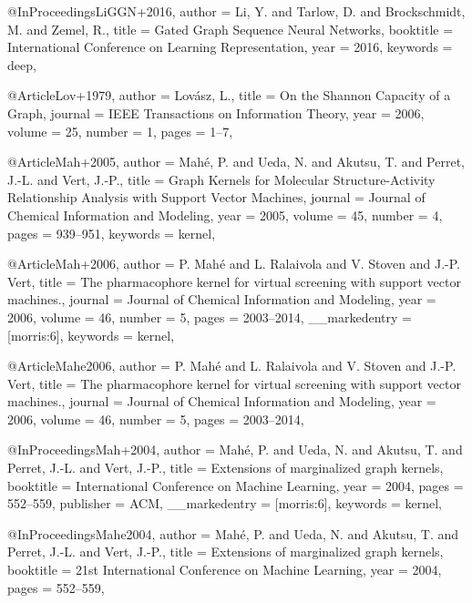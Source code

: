 @InProceedings{LiGGN+2016,
  author    = {Li, Y. and Tarlow, D. and Brockschmidt, M. and Zemel, R.},
  title     = {Gated Graph Sequence Neural Networks},
  booktitle = {International Conference on Learning Representation},
  year      = {2016},
  keywords  = {deep},
}

@Article{Lov+1979,
  author  = {Lovász, L.},
  title   = {On the Shannon Capacity of a Graph},
  journal = {IEEE Transactions on Information Theory},
  year    = {2006},
  volume  = {25},
  number  = {1},
  pages   = {1--7},
}

@Article{Mah+2005,
  author   = {Mah{\'{e}}, P. and Ueda, N. and Akutsu, T. and Perret, J.-L. and Vert, J.-P.},
  title    = {Graph Kernels for Molecular Structure-Activity Relationship Analysis with Support Vector Machines},
  journal  = {Journal of Chemical Information and Modeling},
  year     = {2005},
  volume   = {45},
  number   = {4},
  pages    = {939--951},
  keywords = {kernel},
}

@Article{Mah+2006,
  author        = {P. Mah\'{e} and L. Ralaivola and V. Stoven and J.-P. Vert},
  title         = {The pharmacophore kernel for virtual screening with support vector machines.},
  journal       = {Journal of Chemical Information and Modeling},
  year          = {2006},
  volume        = {46},
  number        = {5},
  pages         = {2003--2014},
  __markedentry = {[morris:6]},
  keywords      = {kernel},
}

@Article{Mahe2006,
  author  = {P. Mah\'{e} and L. Ralaivola and V. Stoven and J.-P. Vert},
  title   = {The pharmacophore kernel for virtual screening with support vector machines.},
  journal = {Journal of Chemical Information and Modeling},
  year    = {2006},
  volume  = {46},
  number  = {5},
  pages   = {2003--2014},
}

@InProceedings{Mah+2004,
  author        = {Mah\'{e}, P. and Ueda, N. and Akutsu, T. and Perret, J.-L. and Vert, J.-P.},
  title         = {Extensions of marginalized graph kernels},
  booktitle     = {International Conference on Machine Learning},
  year          = {2004},
  pages         = {552--559},
  publisher     = {{ACM}},
  __markedentry = {[morris:6]},
  keywords      = {kernel},
}

@InProceedings{Mahe2004,
  author    = {Mah\'{e}, P. and Ueda, N. and Akutsu, T. and Perret, J.-L. and Vert, J.-P.},
  title     = {Extensions of marginalized graph kernels},
  booktitle = {21st International Conference on Machine Learning},
  year      = {2004},
  pages     = {552--559},
}

